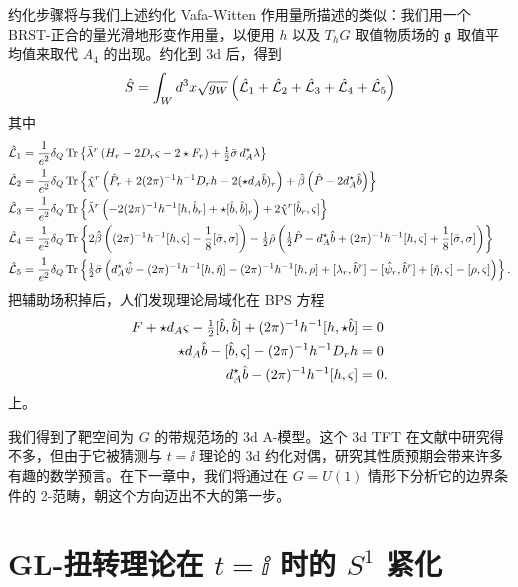 约化步骤将与我们上述约化 Vafa-Witten 作用量所描述的类似：我们用一个 BRST-正合的量光滑地形变作用量，以便用 $h$ 以及 $T_hG$ 取值物质场的 $\mathfrak{g}$ 取值平均值来取代 $A_4$ 的出现。约化到 3d 后，得到
\[
    \hat S = \int_Wd^3x\sqrt{g_W}\left(\hat{\mathcal{L}}_1+\hat{\mathcal{L}}_2+\hat{\mathcal{L}}_3+\hat{\mathcal{L}}_4+\hat{\mathcal{L}}_5\right)
\]
其中
\begin{align*}
    \hat{\mathcal{L}}_1 &= \frac{1}{e^2}\delta_Q\operatorname{Tr}\left\{\tilde\lambda^r\left(H_r - 2D_r\varsigma - 2\star F_r\right) + \tfrac{1}{2}\bar\sigma\, d_A^\star\lambda\right\} \\
    \hat{\mathcal{L}}_2 &= \frac{1}{e^2}\delta_Q\operatorname{Tr}\left\{\hat\chi^r\left(\hat P_r + 2(2\pi)^{-1}h^{-1}D_rh - 2(\star d_A\hat b)_r\right)
        + \hat\beta\left(\hat P - 2d_A^\star\hat b\right)\right\} \\
    \hat{\mathcal{L}}_3 &= \frac{1}{e^2}\delta_Q\operatorname{Tr}\left\{\tilde\lambda^r\left(-2(2\pi)^{-1}h^{-1}[h,\hat b_r] + \star[\hat b,\hat b]_r\right)
        + 2\hat\chi^r[\hat b_r,\varsigma]\right\} \\
    \hat{\mathcal{L}}_4 &= \frac{1}{e^2}\delta_Q\operatorname{Tr}\left\{2\hat\beta\left((2\pi)^{-1}h^{-1}[h,\varsigma] - \frac{1}{8}[\bar\sigma,\sigma]\right)
        - \tfrac{1}{2}\tilde\rho\left(\tfrac{1}{2}\hat P - d_A^\star\hat b + (2\pi)^{-1}h^{-1}[h,\varsigma] + \frac{1}{8}[\bar\sigma,\sigma]\right)\right\} \\
    \hat{\mathcal{L}}_5 &= \frac{1}{e^2}\delta_Q\operatorname{Tr}\left\{\tfrac{1}{2}\bar\sigma\left(d_A^\star\hat\psi - (2\pi)^{-1}h^{-1}[h,\hat\eta]
        - (2\pi)^{-1}h^{-1}[h,\rho] + [\lambda_r,\hat b^r] - [\hat\psi_r,\hat b^r] + [\hat\eta,\varsigma] - [\rho,\varsigma]\right)\right\} .
\end{align*}
把辅助场积掉后，人们发现理论局域化在 BPS 方程
\begin{align*}
    F + \star d_A\varsigma - \tfrac{1}{2}[\hat b,\hat b] + (2\pi)^{-1}h^{-1}[h,\star\hat b] &= 0 \\
    \star d_A\hat b - [\hat b,\varsigma] - (2\pi)^{-1}h^{-1}D_rh &= 0 \\
    d_A^\star\hat b - (2\pi)^{-1}h^{-1}[h,\varsigma] &= 0 .
\end{align*}
上。

我们得到了靶空间为 $G$ 的带规范场的 3d A-模型。这个 3d TFT 在文献中研究得不多，但由于它被猜测与 $t=\ii$ 理论的 3d 约化对偶，研究其性质预期会带来许多有趣的数学预言。在下一章中，我们将通过在 $G=U(1)$ 情形下分析它的边界条件的 2-范畴，朝这个方向迈出不大的第一步。

\section{GL-扭转理论在 \texorpdfstring{$t=\ii$}{t=i} 时的 \texorpdfstring{$S^1$}{S1} 紧化}

